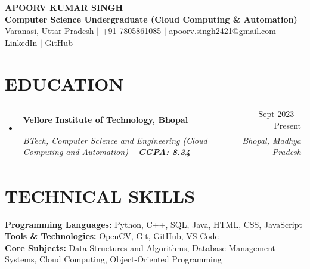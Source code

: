 \documentclass[letterpaper,10pt]{article}
\makeatletter
\newcommand{\resumeSubheading}[4]{
  \vspace{-1pt}\item[]
    \begin{tabular*}{0.98\textwidth}[t]{l@{\extracolsep{\fill}}r}
      \textbf{#1} & #2 \\
      \textit{\small#3} & \textit{\small #4} \\
    \end{tabular*}\vspace{-3pt}
}
\makeatother
\begin{document}
\begin{center}
    {\LARGE \scshape \textbf{APOORV KUMAR SINGH}} \\ \vspace{2pt}
    \small \textbf{Computer Science Undergraduate (Cloud Computing \& Automation)} \\ \vspace{2pt}
    \small Varanasi, Uttar Pradesh $|$ +91-7805861085 $|$ \href{mailto:apoorv.singh2421@gmail.com}{\underline{apoorv.singh2421@gmail.com}} $|$ 
    \href{https://linkedin.com/in/}{\underline{LinkedIn}} $|$
    \href{https://github.com/}{\underline{GitHub}}
\end{center}

\vspace{-3pt}

\section{EDUCATION}
  \begin{itemize}[label={}]
    \resumeSubheading
      {Vellore Institute of Technology, Bhopal}{Sept 2023 -- Present}
      {BTech, Computer Science and Engineering (Cloud Computing and Automation) \textnormal{-- \textbf{CGPA: 8.34}}}{Bhopal, Madhya Pradesh}
  \end{itemize}

\vspace{-3pt}

\section{TECHNICAL SKILLS}
 \begin{itemize}[label={}]
    \small{\item[]{
     \textbf{Programming Languages:}{ Python, C++, SQL, Java, HTML, CSS, JavaScript} \\ \vspace{1.5pt}
     \textbf{Tools \& Technologies:}{ OpenCV, Git, GitHub, VS Code} \\ \vspace{1.5pt}
     \textbf{Core Subjects:}{ Data Structures and Algorithms, Database Management Systems, Cloud Computing, Object-Oriented Programming}
    }}
 \end{itemize}

\vspace{-3pt}

\end{document}

